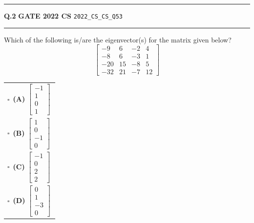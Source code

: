 \documentclass[a4paper,10pt]{article}
\begin{document}
\vspace{6pt}\hrule height 0.35pt\vspace{6pt}
\noindent
\begin{tcolorbox}[
    blanker,
    sidebyside,
    sidebyside align=top,
    lefthand width=0.55\textwidth,
    top=4pt, bottom=4pt, left=0pt, right=0pt,
    middle=16pt,
    underlay={
        \draw[dashed, black!80, line width=0.8pt, dash pattern=on 4pt off 3pt]
            ([xshift=0.55\textwidth+8pt]frame.north west) --
            ([xshift=0.55\textwidth+8pt]frame.south west);
    }
]
\textbf{Q.2}  \hfill {\footnotesize\textbf{GATE 2022 CS} \quad \tiny\texttt{2022\_CS\_CS\_Q53}}
\vspace{2pt}\hrule height 0.3pt\vspace{4pt}

Which of the following is/are the eigenvector(s) for the matrix given below?
\[ \begin{bmatrix} -9 & 6 & -2 & 4 \\ -8 & 6 & -3 & 1 \\ -20 & 15 & -8 & 5 \\ -32 & 21 & -7 & 12 \end{bmatrix} \]

\par\vspace{6pt}\noindent
\begin{tabular}{@{}p{0.98\linewidth}@{}}
$\square$\ \textbf{(A)} $\begin{bmatrix} -1 \\ 1 \\ 0 \\ 1 \end{bmatrix}$ \\
\addlinespace[3pt]
$\square$\ \textbf{(B)} $\begin{bmatrix} 1 \\ 0 \\ -1 \\ 0 \end{bmatrix}$ \\
\addlinespace[3pt]
$\square$\ \textbf{(C)} $\begin{bmatrix} -1 \\ 0 \\ 2 \\ 2 \end{bmatrix}$ \\
\addlinespace[3pt]
$\square$\ \textbf{(D)} $\begin{bmatrix} 0 \\ 1 \\ -3 \\ 0 \end{bmatrix}$
\end{tabular}


\end{tcolorbox}
\end{document}
